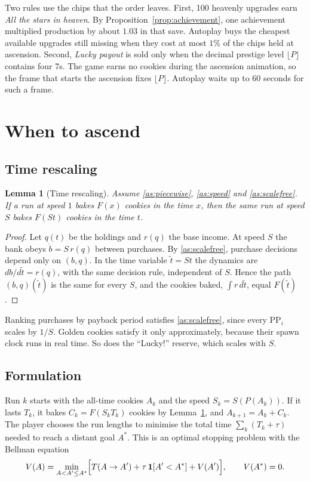 \documentclass[11pt,a4paper]{article}
\numberwithin{equation}{section}
\newtheorem{lemma}[theorem]{Lemma}
\theoremstyle{definition}
\theoremstyle{remark}
\newcommand{\Lucky}{\textup{``Lucky!''}}
\begin{document}
Two rules use the chips that the order leaves. First, 100 heavenly upgrades earn \emph{All the stars in heaven}. By Proposition~\ref{prop:achievement}, one achievement multiplied production by about $1.03$ in that save. Autoplay buys the cheapest available upgrades still missing when they cost at most $1\%$ of the chips held at ascension. Second, \emph{Lucky payout} is sold only when the decimal prestige level $\lfloor P\rfloor$ contains four 7s. The game earns no cookies during the ascension animation, so the frame that starts the ascension fixes $\lfloor P\rfloor$. Autoplay waits up to 60 seconds for such a frame.

\section{When to ascend}\label{sec:ascension}
\subsection{Time rescaling}\label{sec:rescale}
\begin{lemma}[Time rescaling]\label{lem:rescale}
Assume \ref{as:piecewise}, \ref{as:speed} and \ref{as:scalefree}. If a run at speed $1$ bakes $F(x)$ cookies in the time $x$, then the same run at speed $S$ bakes $F(St)$ cookies in the time $t$.
\end{lemma}

\begin{proof}
Let $q(t)$ be the holdings and $r(q)$ the base income. At speed $S$ the bank obeys $\dot b=S\,r(q)$ between purchases. By \ref{as:scalefree}, purchase decisions depend only on $(b,q)$. In the time variable $\tilde t=St$ the dynamics are $db/d\tilde t=r(q)$, with the same decision rule, independent of $S$. Hence the path $(b,q)(\tilde t)$ is the same for every $S$, and the cookies baked, $\int r\,d\tilde t$, equal $F(\tilde t)$.
\end{proof}

Ranking purchases by payback period satisfies \ref{as:scalefree}, since every $\mathrm{PP}_i$ scales by $1/S$. Golden cookies satisfy it only approximately, because their spawn clock runs in real time. So does the \Lucky{} reserve, which scales with $S$.

\subsection{Formulation}\label{sec:formulation}
Run $k$ starts with the all-time cookies $A_k$ and the speed $S_k=S(P(A_k))$. If it lasts $T_k$, it bakes $C_k=F(S_kT_k)$ cookies by Lemma~\ref{lem:rescale}, and $A_{k+1}=A_k+C_k$. The player chooses the run lengths to minimise the total time $\sum_k(T_k+\tau)$ needed to reach a distant goal $A^\ast$. This is an optimal stopping problem with the Bellman equation~\cite{bellman}
\begin{equation}\label{eq:bellman}
 V(A)=\min_{A<A'\le A^\ast}\Bigl[T(A\to A')+\tau\,\mathbf 1[A'<A^\ast]+V(A')\Bigr],\qquad V(A^\ast)=0.
\end{equation}
\end{document}
